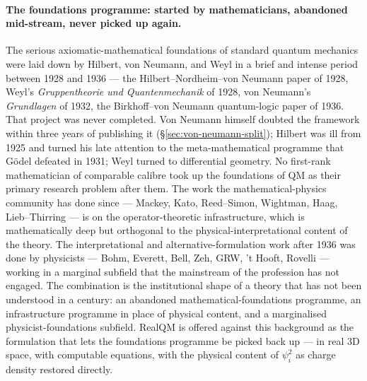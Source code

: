 \paragraph{The foundations programme: started by mathematicians, abandoned mid-stream, never picked up again.}
The serious axiomatic-mathematical foundations of standard quantum mechanics were laid down by Hilbert, von Neumann, and Weyl in a brief and intense period between 1928 and 1936 --- the Hilbert--Nordheim--von Neumann paper of 1928, Weyl's \emph{Gruppentheorie und Quantenmechanik} of 1928, von Neumann's \emph{Grundlagen} of 1932, the Birkhoff--von Neumann quantum-logic paper of 1936. That project was never completed. Von Neumann himself doubted the framework within three years of publishing it (\S\ref{sec:von-neumann-split}); Hilbert was ill from 1925 and turned his late attention to the meta-mathematical programme that G\"odel defeated in 1931; Weyl turned to differential geometry. No first-rank mathematician of comparable calibre took up the foundations of QM as their primary research problem after them. The work the mathematical-physics community has done since --- Mackey, Kato, Reed--Simon, Wightman, Haag, Lieb--Thirring --- is on the operator-theoretic infrastructure, which is mathematically deep but orthogonal to the physical-interpretational content of the theory. The interpretational and alternative-formulation work after 1936 was done by physicists --- Bohm, Everett, Bell, Zeh, GRW, 't Hooft, Rovelli --- working in a marginal subfield that the mainstream of the profession has not engaged. The combination is the institutional shape of a theory that has not been understood in a century: an abandoned mathematical-foundations programme, an infrastructure programme in place of physical content, and a marginalised physicist-foundations subfield. RealQM is offered against this background as the formulation that lets the foundations programme be picked back up --- in real 3D space, with computable equations, with the physical content of $\psi_i^2$ as charge density restored directly.

